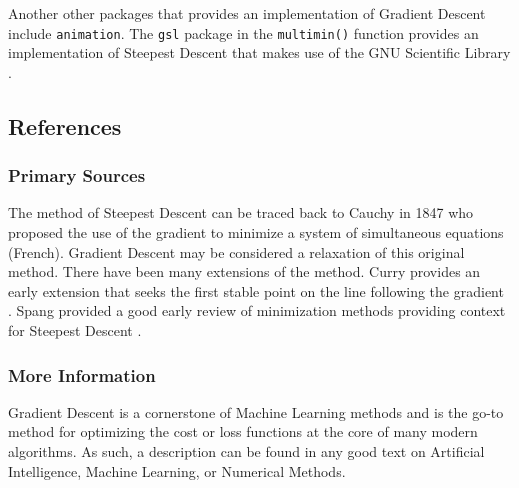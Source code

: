 Another other packages that provides an implementation of Gradient Descent include \texttt{animation}. The \texttt{gsl} package in the \texttt{multimin()} function provides an implementation of Steepest Descent that makes use of the GNU Scientific Library \cite{Hankin2011}.

\subsection{References}

\subsubsection{Primary Sources}
The method of Steepest Descent can be traced back to Cauchy in 1847 who proposed the use of the gradient to minimize a system of simultaneous equations \cite{Cauchy1847} (French). Gradient Descent may be considered a relaxation of this original method.
There have been many extensions of the method. Curry provides an early extension that seeks the first stable point on the line following the gradient \cite{Curry1944}. Spang provided a good early review of minimization methods providing context for Steepest Descent \cite{Spang1962}.

\subsubsection{More Information}
Gradient Descent is a cornerstone of Machine Learning methods and is the go-to method for optimizing the cost or loss functions at the core of many modern algorithms. As such, a description can be found in any good text on Artificial Intelligence, Machine Learning, or Numerical Methods.


